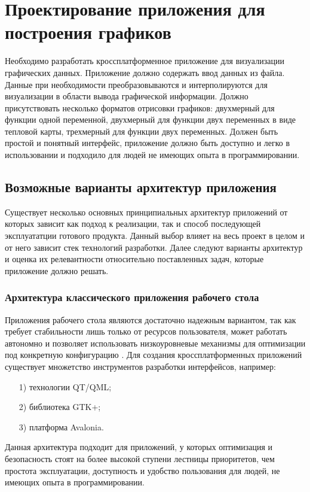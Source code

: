 \chapter{Проектирование приложения для построения графиков} %

Необходимо разработать кроссплатформенное приложение для визуализации графических данных. Приложение должно содержать ввод данных из файла. Данные при необходимости преобразовываются и интерполируются для визуализации в области вывода графической информации. Должно присутствовать несколько форматов отрисовки графиков: двухмерный для функции одной переменной, двухмерный для функции двух переменных в виде тепловой карты, трехмерный для функции двух переменных. Должен быть простой и понятный интерфейс, приложение должно быть доступно и легко в использовании и подходило для людей не имеющих опыта в программировании.
\section{Возможные варианты архитектур приложения} %
Существует несколько основных принципиальных архитектур приложений от которых зависит как подход к реализации, так и способ последующей эксплуататции готового продукта. Данный выбор влияет на весь проект в целом и от него зависит стек технологий разработки. Далее следуют варианты архитектур и оценка их релевантности относительно поставленных задач, которые приложение должно решать.
\subsection{Архитектура классического приложения рабочего стола}
Приложения рабочего стола являются достаточно надежным вариантом, так как требует стабильности лишь только от ресурсов пользователя, может работать автономно и позволяет использовать низкоуровневые механизмы для оптимизации под конкретную конфигурацию \cite{24, 25}. Для создания кроссплатформенных приложений существует множетство инструментов разработки интерфейсов, например:
\begin{enumerate}
    \item [1)] технологии QT/QML;
    \item [2)] библиотека GTK+;
    \item [3)] платформа Avalonia.
\end{enumerate}
Данная архитектура подходит для приложений, у которых оптимизация и безопасность стоят на более высокой ступени лестницы приоритетов, чем простота эксплуатации, доступность и удобство пользования для людей, не имеющих опыта в программировании.

